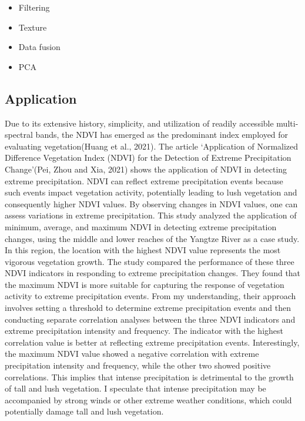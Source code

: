 \documentclass[
  letterpaper,
  DIV=11,
  numbers=noendperiod]{scrreprt}
\providecommand{\tightlist}{%
  \setlength{\itemsep}{0pt}\setlength{\parskip}{0pt}}\usepackage{longtable,booktabs,array}
\begin{document}
\begin{itemize}
\tightlist
\item
  Filtering
\item
  Texture
\item
  Data fusion
\item
  PCA
\end{itemize}

\hypertarget{application-1}{%
\subsection{Application}\label{application-1}}

Due to its extensive history, simplicity, and utilization of readily
accessible multi-spectral bands, the NDVI has emerged as the predominant
index employed for evaluating vegetation(Huang et al., 2021). The
article `Application of Normalized Difference Vegetation Index (NDVI)
for the Detection of Extreme Precipitation Change'(Pei, Zhou and Xia,
2021) shows the application of NDVI in detecting extreme precipitation.
NDVI can reflect extreme precipitation events because such events impact
vegetation activity, potentially leading to lush vegetation and
consequently higher NDVI values. By observing changes in NDVI values,
one can assess variations in extreme precipitation. This study analyzed
the application of minimum, average, and maximum NDVI in detecting
extreme precipitation changes, using the middle and lower reaches of the
Yangtze River as a case study. In this region, the location with the
highest NDVI value represents the most vigorous vegetation growth. The
study compared the performance of these three NDVI indicators in
responding to extreme precipitation changes. They found that the maximum
NDVI is more suitable for capturing the response of vegetation activity
to extreme precipitation events. From my understanding, their approach
involves setting a threshold to determine extreme precipitation events
and then conducting separate correlation analyses between the three NDVI
indicators and extreme precipitation intensity and frequency. The
indicator with the highest correlation value is better at reflecting
extreme precipitation events. Interestingly, the maximum NDVI value
showed a negative correlation with extreme precipitation intensity and
frequency, while the other two showed positive correlations. This
implies that intense precipitation is detrimental to the growth of tall
and lush vegetation. I speculate that intense precipitation may be
accompanied by strong winds or other extreme weather conditions, which
could potentially damage tall and lush vegetation.
\end{document}
